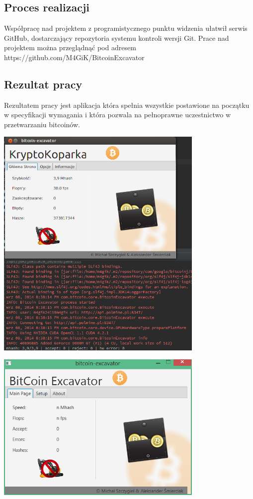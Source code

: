 \documentclass[11pt,a4paper]{article}
\begin{document}
\subsection{Proces realizacji}

Współpracę nad projektem z programistycznego punktu widzenia ułatwił serwis GitHub, dostarczający repozytoria systemu kontroli wersji Git.
Prace nad projektem można przeglądnąć pod adresem
https://github.com/M4GiK/BitcoinExcavator

\subsection{Rezultat pracy}

Rezultatem pracy jest aplikacja która spełnia wszystkie postawione na początku w specyfikacji wymagania i która pozwala na pełnoprawne uczestnictwo w przetwarzaniu bitcoinów.

\includegraphics[width=10cm]{images/excavator_digging_screen_ubuntu.PNG}

\includegraphics[width=10cm]{images/excavator_digging_error_screen.PNG}
\end{document}
